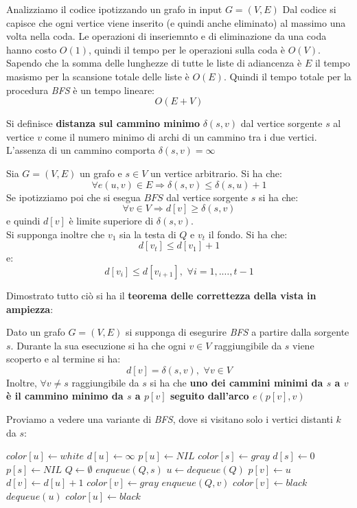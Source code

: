 \documentclass[a4paper,12pt, oneside]{book}
\begin{document}
Analizziamo il codice ipotizzando un grafo in input $G=(V,E)$
Dal codice si capisce che ogni vertice viene inserito (e quindi anche
eliminato) al massimo una volta nella coda. Le operazioni di
inseriemnto e di eliminazione da una coda hanno costo $O(1)$, quindi
il tempo per le operazioni sulla coda è $O(V)$. Sapendo che la somma
delle lunghezze di tutte le liste di adiancenza è $E$ il tempo masismo
per la scansione totale delle liste è $O(E)$. Quindi il tempo totale
per la procedura \textit{BFS} è un tempo lineare:
\[O(E+V)\]
\begin{definizione}
  Si definisce \textbf{distanza sul cammino minimo} $\delta(s,v)$ dal
  vertice sorgente $s$ al vertice $v$ come il numero minimo di archi
  di un cammino tra i due vertici. L'assenza di un cammino comporta $\delta(s,v)=\infty$
\end{definizione}
\begin{lemma}
  Sia $G=(V,E)$ un grafo e $s\in V$ un vertice arbitrario. Si ha che:
  \[\forall e(u,v)\in E \Longrightarrow \delta(s,v)\leq\delta(s,u)+1\]
  Se ipotizziamo poi che si esegua $BFS$ dal vertice sorgente $s$ si
  ha che:
  \[\forall v\in V \Longrightarrow d[v]\geq \delta(s,v)\]
  e quindi $d[v]$ è limite superiore di $\delta(s,v)$.\\
  Si supponga inoltre che $v_1$ sia la testa di $Q$ e $v_t$ il
  fondo. Si ha che:
  \[d[v_t]\leq d[v_1]+1\]
  e:
  \[d[v_i]\leq d[v_{i+1}],\,\, \forall i=1,.\ldots, t-1\]
\end{lemma}
Dimostrato tutto ciò si ha il \textbf{teorema delle correttezza della
  vista in ampiezza}:
\begin{teorema}
  Dato un grafo $G=(V,E)$ si supponga di esegurire \textit{BFS} a
  partire dalla sorgente $s$. Durante la sua esecuzione si ha che
  ogni $v\in V$ raggiungibile da $s$ viene scoperto e al termine si
  ha:
  \[d[v]=\delta(s,v),\,\,\forall v\in V\]
  Inoltre, $\forall v\neq s$ raggiungibile da $s$ si ha che
  \textbf{uno dei cammini minimi da $s$ a $v$ è il cammino minimo da
    $s$ a $p[v]$ seguito dall'arco $e(p[v],v)$}
\end{teorema}
Proviamo a vedere una variante di \textit{BFS}, dove si visitano solo
i vertici distanti $k$ da $s$:
\begin{shaded}
  \begin{algorithmic}[1]
    \State $color[u]\gets white$
    \State $d[u]\gets \infty$
    \State $p[u]\gets NIL$
    \EndFor
    \State $color[s]\gets gray$
    \State $d[s]\gets 0$
    \State $p[s]\gets NIL$
    \State $Q\gets \emptyset$
    \State $enqueue(Q,s)$
    \State $u\gets dequeue(Q)$
    \State $p[v]\gets u$
    \State $d[v]\gets d[u]+1$
    \State $color[v]\gets gray$
    \State $enqueue(Q,v)$
    \Else
    \State $color[v]\gets black$
    \EndIf
    \EndIf
    \EndFor
    \State $dequeue(u)$
    \State $color[u]\gets black$ 
    \EndWhile
    \EndFunction
  \end{algorithmic}
\end{shaded}
\end{document}

